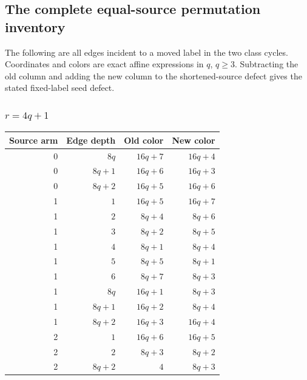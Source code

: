 \subsection{The complete equal-source permutation inventory}
\label{templates:equal-local-colors}
The following are all edges incident to a moved label in the two class cycles. Coordinates and colors are exact affine expressions in $q$, $q\ge3$. Subtracting the old column and adding the new column to the shortened-source defect gives the stated fixed-label seed defect.
\subsubsection[r=4q+1]{$r=4q+1$}
\begin{longtable}{rrrr}
Source arm & Edge depth & Old color & New color\\\hline\endhead
0 & $8q$ & $16q+7$ & $16q+4$\\
0 & $8q+1$ & $16q+6$ & $16q+3$\\
0 & $8q+2$ & $16q+5$ & $16q+6$\\
1 & $1$ & $16q+5$ & $16q+7$\\
1 & $2$ & $8q+4$ & $8q+6$\\
1 & $3$ & $8q+2$ & $8q+5$\\
1 & $4$ & $8q+1$ & $8q+4$\\
1 & $5$ & $8q+5$ & $8q+1$\\
1 & $6$ & $8q+7$ & $8q+3$\\
1 & $8q$ & $16q+1$ & $8q+3$\\
1 & $8q+1$ & $16q+2$ & $8q+4$\\
1 & $8q+2$ & $16q+3$ & $16q+4$\\
2 & $1$ & $16q+6$ & $16q+5$\\
2 & $2$ & $8q+3$ & $8q+2$\\
2 & $8q+2$ & $4$ & $8q+3$\\
\end{longtable}
